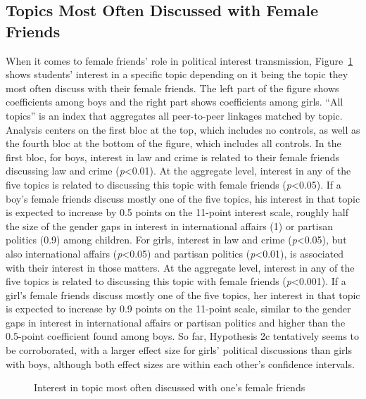 \documentclass[
  letterpaper,
  DIV=11,
  numbers=noendperiod]{scrreprt}
\begin{document}
\subsection{Topics Most Often Discussed with Female
Friends}\label{topics-most-often-discussed-with-female-friends}

When it comes to female friends' role in political interest
transmission, Figure~\ref{fig-femalefriends} shows students' interest in
a specific topic depending on it being the topic they most often discuss
with their female friends. The left part of the figure shows
coefficients among boys and the right part shows coefficients among
girls. ``All topics'' is an index that aggregates all peer-to-peer
linkages matched by topic. Analysis centers on the first bloc at the
top, which includes no controls, as well as the fourth bloc at the
bottom of the figure, which includes all controls. In the first bloc,
for boys, interest in law and crime is related to their female friends
discussing law and crime (\emph{p}\textless0.01). At the aggregate
level, interest in any of the five topics is related to discussing this
topic with female friends (\emph{p}\textless0.05). If a boy's female
friends discuss mostly one of the five topics, his interest in that
topic is expected to increase by 0.5 points on the 11-point interest
scale, roughly half the size of the gender gaps in interest in
international affairs (1) or partisan politics (0.9) among children. For
girls, interest in law and crime (\emph{p}\textless0.05), but also
international affairs (\emph{p}\textless0.05) and partisan politics
(\emph{p}\textless0.01), is associated with their interest in those
matters. At the aggregate level, interest in any of the five topics is
related to discussing this topic with female friends
(\emph{p}\textless0.001). If a girl's female friends discuss mostly one
of the five topics, her interest in that topic is expected to increase
by 0.9 points on the 11-point scale, similar to the gender gaps in
interest in international affairs or partisan politics and higher than
the 0.5-point coefficient found among boys. So far, Hypothesis 2c
tentatively seems to be corroborated, with a larger effect size for
girls' political discussions than girls with boys, although both effect
sizes are within each other's confidence intervals.

\begin{figure}


\caption{\label{fig-femalefriends}Interest in topic most often discussed
with one's female friends}

\end{figure}%
\end{document}
